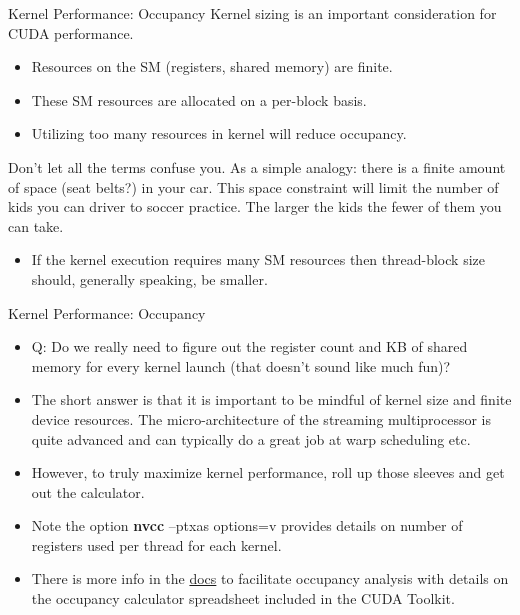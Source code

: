 \documentclass[handout]{beamer}
\begin{document}
\begin{frame}{Kernel Performance: Occupancy}
Kernel sizing is an important consideration for CUDA performance.
\begin{itemize}
	\item<1->Resources on the SM (registers, shared memory) are finite.
	\item<1->These SM resources are allocated on a per-block basis.
	\item<1->Utilizing too many resources in kernel will reduce occupancy.
\end{itemize}
\hfill\break
Don't let all the terms confuse you.  As a simple analogy: there is a finite amount of space (seat belts?) in your car.  This space constraint will limit the number of kids you can driver to soccer practice.  The larger the kids the fewer of them you can take. 
\hfill\break
\begin{itemize}
	\item<1->If the kernel execution requires many SM resources then thread-block size should, generally speaking, be smaller.  
\end{itemize}
\end{frame}

\begin{frame}{Kernel Performance: Occupancy}
\begin{itemize}
\itemsep1em
	\item<1->Q: Do we really need to figure out the register count and KB of shared memory for every kernel launch (that doesn't sound like much fun)?
	\item<1->The short answer is that it is important to be mindful of kernel size and finite device resources.  The micro-architecture of the streaming multiprocessor is quite advanced and can typically do a great job at warp scheduling etc. 
	\item<1->However, to truly maximize kernel performance, roll up those sleeves and get out the calculator.
	\item<1->Note the option {\selectfont \textbf{nvcc} --ptxas options=v} provides details on number of registers used per thread for each kernel.
	\item<1->There is more info in the \href{http://docs.nvidia.com/cuda/cuda-c-best-practices-guide/index.html\#occupancy}{\color{blue}docs} to facilitate occupancy analysis with details on the occupancy calculator spreadsheet included in the CUDA Toolkit. 
\end{itemize}
\end{frame}
\end{document}
